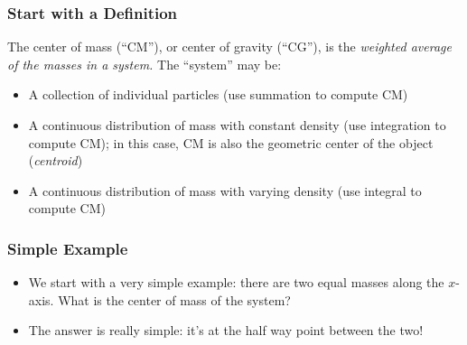 \documentclass[12pt,compress,aspectratio=169]{beamer}
\begin{document}
\begin{frame}
  \frametitle{Start with a Definition} %
  The center of mass (``CM''), or center of gravity (``CG''), is the
  \emph{weighted average of the masses in a system.} The ``system'' may be:
  \begin{itemize}
  \item A collection of individual particles (use summation to compute CM)
  \item A continuous distribution of mass with constant density (use
    integration to compute CM); in this case, CM is also the geometric center
    of the object (\emph{centroid})
  \item A continuous distribution of mass with varying density (use integral to
    compute CM)
  \end{itemize}
\end{frame}


\begin{frame}
  \frametitle{Simple Example}
  \begin{itemize}
  \item We start with a very simple example: there are two equal masses along
    the $x$-axis. What is the center of mass of the system?
    
    \vspace{0.25in}
    \begin{center}
    \end{center}
    \vspace{0.2in}

  \item<2-> The answer is really simple: it's at the half way point between
    the two!
  \end{itemize}
\end{frame}
\end{document}

